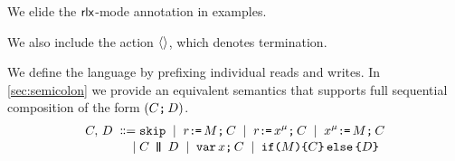 We elide the ${\mathsf{rlx}}$-mode annotation in examples.
\begin{comment}
\footnote{We only consider executions where register state is empty in
  forked threads.  Given item~\ref{pre-acquire} of
  Definition~\ref{def:prefix}, a sufficient condition is that parallel
  composition is always preceded by an acquire fence, as in programs of the
  form:
  \begin{displaymath}
    \VAR\vec{\aLoc}\SEMI
    \vec{\aLoc}\GETS\vec{0}\SEMI
    \vec{\bLoc}\GETS\vec{0}\SEMI
    \FENCE\SEMI
    (\aCmd^1 \PAR \cdots \PAR \aCmd^n)
  \end{displaymath}
  where $\aCmd^1$, \ldots, $\aCmd^n$ do not include $\PAR$.  To avoid clutter
  in drawings, we often drop the explicit fence.}.
\end{comment}

We also include the action $\langle\rangle$, which denotes termination.

We define the language by prefixing individual reads and writes.  In
\textsection\ref{sec:semicolon} we provide an equivalent semantics that supports
full sequential composition of the form $(C\texttt{;}\,\allowbreak D)$.
\begin{align*}
C,\,D
\;\mathrel{\mathord{\vcentcolon}\mkern-1mu\mathord{\vcentcolon}\mathord{{=}}}\;& \texttt{skip}
\;\mathrel{|}\; r\texttt{:}\mkern-1mu\texttt{=}\,M\texttt{;}\,\allowbreak C
\;\mathrel{|}\; r\texttt{:}\mkern-1mu\texttt{=}\,x^{\mu}\texttt{;}\,\allowbreak C 
\;\mathrel{|}\; x^{\mu}\texttt{:}\mkern-1mu\texttt{=}\,M\texttt{;}\,\allowbreak C
\\[-.5ex]
\;\mathrel{|}\;&C \,\mathbin{\texttt{\textbf{|}}\mkern-6mu\texttt{\textbf{|}}}\, D
\;\mathrel{|}\; \texttt{var}\,x\texttt{;}\,\allowbreak C
\;\mathrel{|}\; \texttt{if}\allowbreak\texttt{(}M\texttt{)} \allowbreak\texttt{\{} C \texttt{\}}\,\allowbreak\texttt{else}\allowbreak\,\texttt{\{} D \texttt{\}}
\end{align*}




